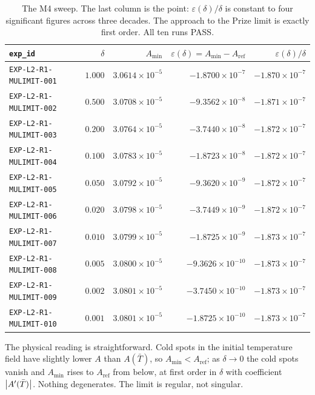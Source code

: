 \begin{table}[ht]
\centering
\small
\begin{tabular}{@{}l r r r r@{}}
\toprule
\texttt{exp\_id} & \(\delta\) & \(A_{\min}\) &
\(\varepsilon(\delta)=A_{\min}-A_{\mathrm{ref}}\) &
\(\varepsilon(\delta)/\delta\) \\
\midrule
\texttt{EXP-L2-R1-MULIMIT-001} & \(1.000\) & \(3.0614\!\times\!10^{-5}\) & \(-1.8700\!\times\!10^{-7}\) & \(-1.870\!\times\!10^{-7}\) \\
\texttt{EXP-L2-R1-MULIMIT-002} & \(0.500\) & \(3.0708\!\times\!10^{-5}\) & \(-9.3562\!\times\!10^{-8}\) & \(-1.871\!\times\!10^{-7}\) \\
\texttt{EXP-L2-R1-MULIMIT-003} & \(0.200\) & \(3.0764\!\times\!10^{-5}\) & \(-3.7440\!\times\!10^{-8}\) & \(-1.872\!\times\!10^{-7}\) \\
\texttt{EXP-L2-R1-MULIMIT-004} & \(0.100\) & \(3.0783\!\times\!10^{-5}\) & \(-1.8723\!\times\!10^{-8}\) & \(-1.872\!\times\!10^{-7}\) \\
\texttt{EXP-L2-R1-MULIMIT-005} & \(0.050\) & \(3.0792\!\times\!10^{-5}\) & \(-9.3620\!\times\!10^{-9}\) & \(-1.872\!\times\!10^{-7}\) \\
\texttt{EXP-L2-R1-MULIMIT-006} & \(0.020\) & \(3.0798\!\times\!10^{-5}\) & \(-3.7449\!\times\!10^{-9}\) & \(-1.872\!\times\!10^{-7}\) \\
\texttt{EXP-L2-R1-MULIMIT-007} & \(0.010\) & \(3.0799\!\times\!10^{-5}\) & \(-1.8725\!\times\!10^{-9}\) & \(-1.873\!\times\!10^{-7}\) \\
\texttt{EXP-L2-R1-MULIMIT-008} & \(0.005\) & \(3.0800\!\times\!10^{-5}\) & \(-9.3626\!\times\!10^{-10}\) & \(-1.873\!\times\!10^{-7}\) \\
\texttt{EXP-L2-R1-MULIMIT-009} & \(0.002\) & \(3.0801\!\times\!10^{-5}\) & \(-3.7450\!\times\!10^{-10}\) & \(-1.873\!\times\!10^{-7}\) \\
\texttt{EXP-L2-R1-MULIMIT-010} & \(0.001\) & \(3.0801\!\times\!10^{-5}\) & \(-1.8725\!\times\!10^{-10}\) & \(-1.873\!\times\!10^{-7}\) \\
\bottomrule
\end{tabular}
\caption[The 2D \(\mu(T)\to\nu\) limit]{The M4 sweep. The last column is the
point: \(\varepsilon(\delta)/\delta\) is constant to four significant figures
across three decades. The approach to the Prize limit is exactly first order.
All ten runs \textsf{PASS}.}
\label{tab:mu-limit-2d}
\end{table}

The physical reading is straightforward. Cold spots in the initial temperature
field have slightly lower \(A\) than \(A(\bar T)\), so \(A_{\min}<
A_{\mathrm{ref}}\); as \(\delta\to0\) the cold spots vanish and \(A_{\min}\)
rises to \(A_{\mathrm{ref}}\) from below, at first order in \(\delta\) with
coefficient \(\left|A'(\bar T)\right|\). Nothing degenerates. The limit is regular,
not singular.

